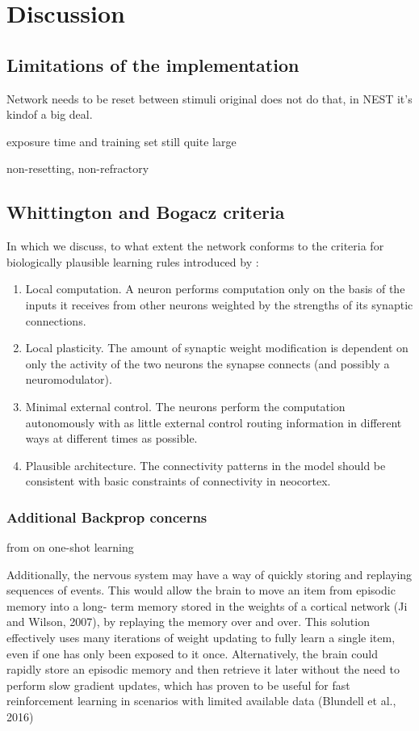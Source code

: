 
\chapter{Discussion}


\section{Limitations of the implementation}

Network needs to be reset between stimuli
original does not do that, in NEST it's kindof a big deal.

exposure time and training set still quite large

non-resetting, non-refractory


\section{Whittington and Bogacz criteria}

In which we discuss, to what extent the network conforms to the criteria for biologically plausible learning rules
introduced by \cite{Whittington2017}:
\begin{enumerate}
      \item Local computation. A neuron performs computation only on the basis
            of the inputs it receives from other neurons weighted by the strengths
            of its synaptic connections.
      \item  Local plasticity. The amount of synaptic weight modification is dependent on only the activity of the two
            neurons the synapse connects (and possibly a neuromodulator).
      \item  Minimal external control. The neurons perform the computation autonomously with as little external control
            routing information in different ways at different times as possible.
      \item   Plausible architecture. The connectivity patterns in the model should
            be consistent with basic constraints of connectivity in neocortex.
\end{enumerate}


\subsection{Additional Backprop concerns}


from \citep{Marblestone2016} on one-shot learning

Additionally, the nervous system may have a way of quickly
storing and replaying sequences of events. This would allow
the brain to move an item from episodic memory into a long-
term memory stored in the weights of a cortical network (Ji and
Wilson, 2007), by replaying the memory over and over. This
solution effectively uses many iterations of weight updating to
fully learn a single item, even if one has only been exposed to
it once. Alternatively, the brain could rapidly store an episodic
memory and then retrieve it later without the need to perform
slow gradient updates, which has proven to be useful for
fast reinforcement learning in scenarios with limited available
data (Blundell et al., 2016)


